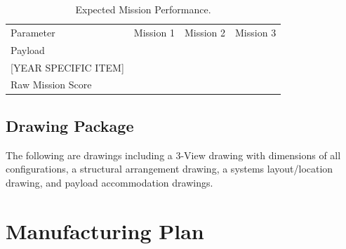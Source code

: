 \documentclass[report]{byu-aero}
\begin{document}
\begin{table}[h!]
	\centering
	\caption{Expected Mission Performance.}
	\label{tab:expectedmissionperformance}
	\begin{tabular}{ C{1.5in}  C{1in}  C{1in}  C{1in}}
		
		Parameter & Mission 1 & Mission 2 & Mission 3 \\
		
		Payload & & &\\
		
		{\color{\BYUred} {\color{BYUred} [YEAR SPECIFIC ITEM]}} & & &\\
		
		Raw Mission Score & & &\\
		
	\end{tabular}
\end{table}


\subsection{Drawing Package}
\label{ssec:drawings}

The following are drawings including a 3-View drawing with dimensions of all configurations, a structural arrangement drawing, a systems layout/location drawing, and payload accommodation drawings.









\section{Manufacturing Plan} %
\label{sec:ManufacturingPlan}
\end{document}
